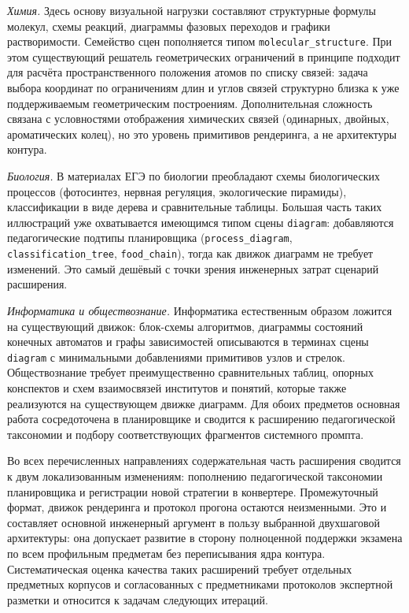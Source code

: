 \textit{Химия.} Здесь основу визуальной нагрузки составляют структурные формулы молекул, схемы реакций, диаграммы фазовых переходов и графики растворимости. Семейство сцен пополняется типом \texttt{molecular\_structure}. При этом существующий решатель геометрических ограничений в принципе подходит для расчёта пространственного положения атомов по списку связей: задача выбора координат по ограничениям длин и углов связей структурно близка к уже поддерживаемым геометрическим построениям. Дополнительная сложность связана с условностями отображения химических связей (одинарных, двойных, ароматических колец), но это уровень примитивов рендеринга, а не архитектуры контура.

\textit{Биология.} В материалах ЕГЭ по биологии преобладают схемы биологических процессов (фотосинтез, нервная регуляция, экологические пирамиды), классификации в виде дерева и сравнительные таблицы. Большая часть таких иллюстраций уже охватывается имеющимся типом сцены \texttt{diagram}: добавляются педагогические подтипы планировщика (\texttt{process\_diagram}, \texttt{classification\_tree}, \texttt{food\_chain}), тогда как движок диаграмм не требует изменений. Это самый дешёвый с точки зрения инженерных затрат сценарий расширения.

\textit{Информатика и обществознание.} Информатика естественным образом ложится на существующий движок: блок-схемы алгоритмов, диаграммы состояний конечных автоматов и графы зависимостей описываются в терминах сцены \texttt{diagram} с минимальными добавлениями примитивов узлов и стрелок. Обществознание требует преимущественно сравнительных таблиц, опорных конспектов и схем взаимосвязей институтов и понятий, которые также реализуются на существующем движке диаграмм. Для обоих предметов основная работа сосредоточена в планировщике и сводится к расширению педагогической таксономии и подбору соответствующих фрагментов системного промпта.

Во всех перечисленных направлениях содержательная часть расширения сводится к двум локализованным изменениям: пополнению педагогической таксономии планировщика и регистрации новой стратегии в конвертере. Промежуточный формат, движок рендеринга и протокол прогона остаются неизменными. Это и составляет основной инженерный аргумент в пользу выбранной двухшаговой архитектуры: она допускает развитие в сторону полноценной поддержки экзамена по всем профильным предметам без переписывания ядра контура. Систематическая оценка качества таких расширений требует отдельных предметных корпусов и согласованных с предметниками протоколов экспертной разметки и относится к задачам следующих итераций.

